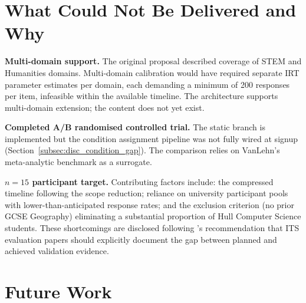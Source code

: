 \section{What Could Not Be Delivered and Why}
\label{sec:disc_not_delivered}

\textbf{Multi-domain support.} The original proposal described coverage of
STEM and Humanities domains. Multi-domain calibration would have required
separate IRT parameter estimates per domain, each demanding a minimum of 200
responses per item, infeasible within the available timeline. The architecture
supports multi-domain extension; the content does not yet exist.

\textbf{Completed A/B randomised controlled trial.} The static branch is
implemented but the condition assignment pipeline was not fully wired at signup
(Section~\ref{subsec:disc_condition_gap}). The comparison relies on VanLehn's
meta-analytic benchmark as a surrogate.

\textbf{$n = 15$ participant target.} Contributing factors include: the
compressed timeline following the scope reduction; reliance on university
participant pools with lower-than-anticipated response rates; and the exclusion
criterion (no prior GCSE Geography) eliminating a substantial proportion of
Hull Computer Science students. These shortcomings are disclosed following
\textcite{woolf2010}'s recommendation that ITS evaluation papers should
explicitly document the gap between planned and achieved validation evidence.

\section{Future Work}
\label{sec:disc_future}

